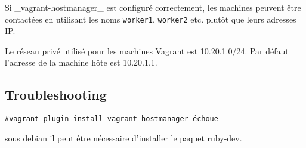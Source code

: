 \documentclass[a4paper,oneside,10pt]{article}
\begin{document}
Si \_vagrant-hostmanager\_ est configuré correctement, les machines peuvent être contactées en utilisant les noms \verb!worker1!, \verb!worker2! etc. plutôt que leurs adresses IP.

Le réseau privé utilisé pour les machines Vagrant est 10.20.1.0/24. Par défaut l'adresse de la machine hôte est 10.20.1.1.

\subsection{Troubleshooting}

\verb!#vagrant plugin install vagrant-hostmanager échoue!

sous debian il peut être nécessaire d'installer le paquet ruby-dev.
\end{document}
